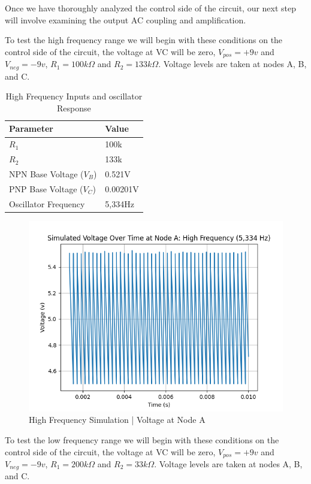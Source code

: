 \documentclass{article}
\begin{document}
Once we have thoroughly analyzed the control side of the circuit, our next step will involve examining the output AC coupling and amplification.

To test the high frequency range we will begin with these conditions on the control side of the circuit, the voltage at VC will be zero, $V_{pos} = +9 v$ and $V_{neg} = -9 v$, $R_1 = 100k \Omega$ and $R_2 = 133k \Omega$. Voltage levels are taken at nodes A, B, and C.

\begin{center}
  \begin{table}[H]
    \centering
    \begin{tabular}{ll}
    \toprule
    Parameter & Value \\
    \midrule
    $R_1$ & 100k \\
    $R_2$ & 133k \\
    NPN Base Voltage ($V_B$) & 0.521V \\
    PNP Base Voltage ($V_C$) & 0.00201V \\
    Oscillator Frequency & 5,334Hz \\
    \bottomrule
    \end{tabular}
    \caption{High Frequency Inputs and oscillator Response}
    \end{table}
\end{center}
\vspace{-1.5cm}
\begin{figure}[H]
  \centering
  \includegraphics[width=.7\linewidth]{png/Figure_1.png}
  \caption{High Frequency Simulation | Voltage at Node A}
\end{figure}

To test the low frequency range we will begin with these conditions on the control side of the circuit, the voltage at VC will be zero, $V_{pos} = +9 v$ and $V_{neg} = -9 v$, $R_1 = 200k \Omega$ and $R_2 = 33k \Omega$. Voltage levels are taken at nodes A, B, and C.
\end{document}
